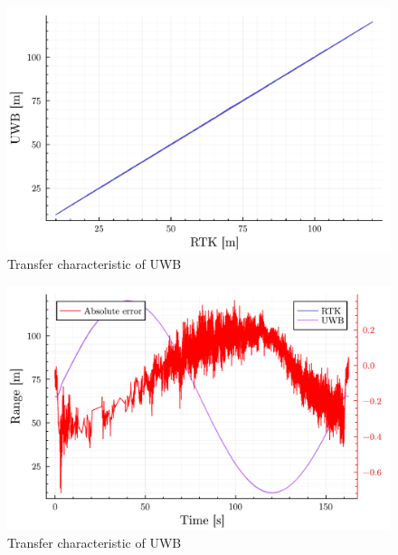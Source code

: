 \documentclass[twoside]{ctustyle/ctuthesis}
\theoremstyle{plain}
\theoremstyle{definition}
\theoremstyle{note}
\begin{document}
\begin{figure}

{\centering \includegraphics{chapters/6_experiments_files/figure-pdf/fig-tranfer-function-output-1.pdf}

}

\caption{\label{fig-tranfer-function}Transfer characteristic of UWB}

\end{figure}

\begin{figure}

{\centering \includegraphics{chapters/6_experiments_files/figure-pdf/fig-line-in-time-output-1.pdf}

}

\caption{\label{fig-line-in-time}Transfer characteristic of UWB}

\end{figure}
\end{document}
